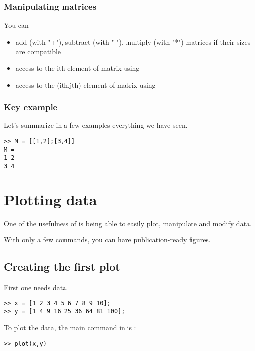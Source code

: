 \subsection{Manipulating matrices}
You can
\begin{itemize}
	\item add (with "+"), subtract (with "-"), multiply (with "*") matrices if their sizes are compatible
	\item access to the ith element of matrix  using 
	\item access to the (ith,jth) element of matrix  using 
\end{itemize}	

\subsection{Key example}
Let's summarize in a few examples everything we have seen.

\begin{lstlisting}
>> M = [[1,2];[3,4]]
M = 
1 2 
3 4
\end{lstlisting}






\chapter{Plotting data}



One of the usefulness of \matlab is being able to easily plot, manipulate and modify data.

With only a few commands, you can have publication-ready figures.

\section{Creating the first plot}

First one needs data.

\begin{lstlisting}
>> x = [1 2 3 4 5 6 7 8 9 10];
>> y = [1 4 9 16 25 36 64 81 100];
\end{lstlisting}

To plot the data, the main command in \matlab is :

\begin{lstlisting}
>> plot(x,y)
\end{lstlisting}







